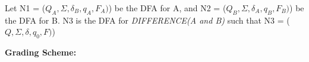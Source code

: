 \documentclass[11pt, article, oneside]{memoir}
\begin{document}
\begin{enumerate}
        Let N1 = (\(Q_A, \Sigma, \delta_B, q_A, F_A)\)) be the DFA for A, and N2 = (\(Q_B, \Sigma, \delta_A, q_B, F_B)\)) be the DFA for B. N3 is the DFA for \textit{DIFFERENCE(A and B)} such that N3 = (\(Q, \Sigma, \delta, q_0, F)\))

        \textbf{Grading Scheme:}
\end{enumerate}















\end{document}
